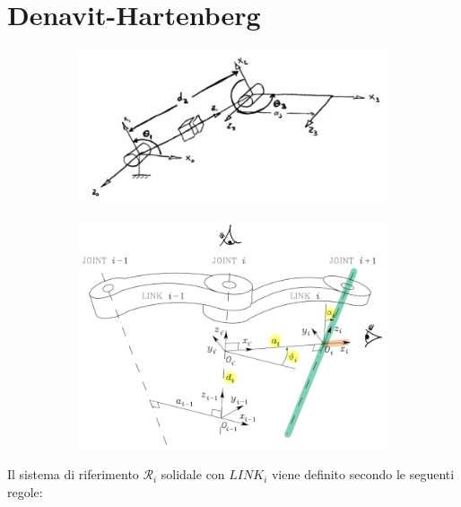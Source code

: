 \section{Denavit-Hartenberg}

\vspace*{-15pt}
\begin{figure}[H]
	\hspace*{10pt}
	\begin{subfigure}{0.23\columnwidth}
		\includegraphics[align=c,angle=90,origin=c,width=\linewidth]{images/dh2}
	\end{subfigure}
	\begin{subfigure}{\columnwidth}
		\includegraphics[align=c,width=0.7\linewidth]{images/dh}
	\end{subfigure}
\end{figure}

Il sistema di riferimento $\mathcal{R}_i$ solidale con $\textit{LINK}_i$ viene definito secondo le seguenti regole:\\

